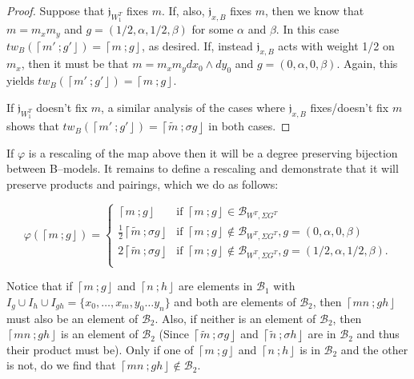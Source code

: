 \documentclass[10pt, letterpaper]{amsart}
\theoremstyle{remark}
\newtheorem{rem}{Remark}[thm]
\newcommand{\sB}{\mathscr{B}}
\newcommand{\fjrw}[2]{ \left\lceil #1 \:; #2 \right\rfloor }
\newcommand{\jw}{\mathfrak{j}}
\newcommand{\s}[1]{\Sigma #1}
\begin{document}
\begin{proof}
Suppose that $\jw_{W_1^T}$ fixes $m$.  If, also, $\jw_{x,B}$ fixes $m$, then we know that $m = m_x m_y$ and $g = (1/2, \alpha, 1/2, \beta)$ for some $\alpha$ and $\beta$.  In this case $tw_B(\fjrw{m'}{g'}) = \fjrw{m}{g}$, as desired. If, instead $\jw_{x, B}$ acts with weight 1/2 on $m_x$, then it must be that $m = m_x m_y dx_0 \wedge dy_0$ and $g = (0, \alpha, 0, \beta)$.  Again, this yields $tw_B(\fjrw{m'}{g'}) = \fjrw{m}{g}$.

If $\jw_{W_1^T}$ doesn't fix $m$, a similar analysis of the cases where $\jw_{x,B}$ fixes/doesn't fix $m$ shows that $tw_B(\fjrw{m'}{g'}) = \fjrw{\tilde m}{\sigma g}$ in both cases. 
\end{proof}

 
  If $\varphi$ is a rescaling of the map above then it will be a degree preserving bijection between B--models.  It remains to define a rescaling and demonstrate that it will preserve products and pairings, which we do as follows: 




\[
\varphi(\fjrw{m}{g}) = \left\{ \begin{array}{ll} \fjrw{m}{g} & \text{if } \fjrw{m}{g} \in \sB_{W^T, \s{G^T}} \\ 
\tfrac 12 \fjrw{\tilde m}{\sigma g} & \text{if } \fjrw{m}{g} \notin \sB_{W^T, \s{G^T}}, g = (0, \alpha, 0, \beta) \\ 
2\fjrw{\tilde m}{\sigma g} & \text{if } \fjrw{m}{g} \notin \sB_{W^T, \s{G^T}}, g = (1/2, \alpha, 1/2, \beta). \\ 
\end{array}\right.
\]



Notice that if $\fjrw{m}{g}$ and $\fjrw{n}{h}$ are elements in $\sB_1$ with $I_g \cup I_h \cup I_{gh} = \{x_0, \ldots, x_m, y_0 \ldots y_n\}$ and both are elements of $\sB_2$, then $\fjrw{mn}{gh}$  must also be an element of $\sB_2$. Also, if neither is an element of $\sB_2$, then $\fjrw{mn}{gh}$ is an element of $\sB_2$ (Since $\fjrw{\tilde m}{\sigma g}$ and $\fjrw{\tilde n}{\sigma h}$ are in $\sB_2$ and thus their product must be).  Only if one  of  $\fjrw{m}{g}$ and $\fjrw{n}{h}$ is in $\sB_2$ and the other is not, do we find that $\fjrw{mn}{gh} \notin \sB_2$. 
\end{document}
